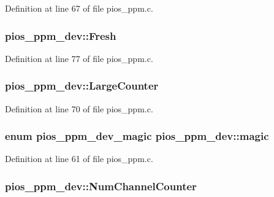 Definition at line 67 of file pios\-\_\-ppm.\-c.

\hypertarget{structpios__ppm__dev_a276c9eba5e4511f04af792d37819f808}{
\subsubsection[{Fresh}]{ pios\-\_\-ppm\-\_\-dev\-::\-Fresh}}\label{structpios__ppm__dev_a276c9eba5e4511f04af792d37819f808}


Definition at line 77 of file pios\-\_\-ppm.\-c.

\hypertarget{structpios__ppm__dev_ac18ce6183b9943ec4bae05ec82c8b595}{
\subsubsection[{Large\-Counter}]{ pios\-\_\-ppm\-\_\-dev\-::\-Large\-Counter}}\label{structpios__ppm__dev_ac18ce6183b9943ec4bae05ec82c8b595}


Definition at line 70 of file pios\-\_\-ppm.\-c.

\hypertarget{structpios__ppm__dev_a1e45b2498e0e64e13001774d17d95417}{
\subsubsection[{magic}]{\setlength{\rightskip}{0pt plus 5cm}enum {\bf pios\-\_\-ppm\-\_\-dev\-\_\-magic} pios\-\_\-ppm\-\_\-dev\-::magic}}\label{structpios__ppm__dev_a1e45b2498e0e64e13001774d17d95417}


Definition at line 61 of file pios\-\_\-ppm.\-c.

\hypertarget{structpios__ppm__dev_aace8701f1500560123d6eccc8a5150c3}{
\subsubsection[{Num\-Channel\-Counter}]{ pios\-\_\-ppm\-\_\-dev\-::\-Num\-Channel\-Counter}}\label{structpios__ppm__dev_aace8701f1500560123d6eccc8a5150c3}


